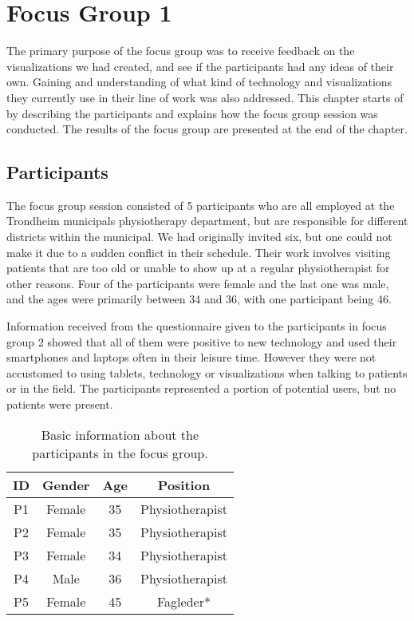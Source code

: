 \chapter{Focus Group 1}
\label{ch:focusGroup1}
The primary purpose of the focus group was to receive feedback on the visualizations we had created, and see if the participants had any ideas of their own. Gaining and understanding of what kind of technology and visualizations they currently use in their line of work was also addressed. This chapter starts of by describing the participants and explains how the focus group session was conducted. The results of the focus group are presented at the end of the chapter.

\section{Participants}
The focus group session consisted of 5 participants who are all employed at the Trondheim municipals physiotherapy department, but are responsible for different districts within the municipal. We had originally invited six, but one could not make it due to a sudden conflict in their schedule. Their work involves visiting patients that are too old or unable to show up at a regular physiotherapist for other reasons. Four of the participants were female and the last one was male, and the ages were primarily between 34 and 36, with one participant being 46. 

Information received from the questionnaire given to the participants in focus group 2 showed that all of them were positive to new technology and used their smartphones and laptops often in their leisure time. However they were not accustomed to using tablets, technology or visualizations when talking to patients or in the field. The participants represented a portion of potential users, but no patients were present.

\begin{table}[h!]
  \begin{center}
  \begin{tabular}{|c|c|c|c|}
    \hline
    \textbf{ID} & \textbf{Gender} & \textbf{Age} & \textbf{Position} \\ \hline
    P1 & Female & 35 & Physiotherapist \\ \hline
    P2 & Female & 35 & Physiotherapist \\ \hline
    P3 & Female & 34 & Physiotherapist \\ \hline
    P4 & Male & 36 & Physiotherapist \\ \hline
    P5 & Female & 45 & Fagleder* \\ \hline
  \end{tabular}
  \end{center}
  \caption{Basic information about the participants in the focus group.}
  \label{tab:participants}
\end{table}

